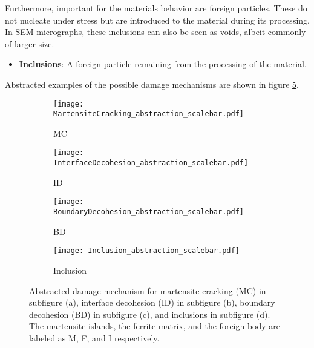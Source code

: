 Furthermore, important for the materials behavior are foreign particles. These do not nucleate under stress but are introduced to the material during its processing. In SEM micrographs, these inclusions can also be seen as voids, albeit commonly of larger size.
\begin{itemize}[label={}]
\item \textbf{Inclusions}: A foreign particle remaining from the processing of the material. 
\end{itemize}
Abstracted examples of the possible damage mechanisms are shown in figure \ref{fig:DamageCategories_abstraction}. \\



\begin{figure}[H]
\begin{subfigure}{.25\textwidth}
\centering
  \texttt{[image: MartensiteCracking\_abstraction\_scalebar.pdf]}
  \caption{MC}
  \label{sub:MC}
\end{subfigure}%
\begin{subfigure}{.25\textwidth}
\centering
  \texttt{[image: InterfaceDecohesion\_abstraction\_scalebar.pdf]}
  \caption{ID}
  \label{sub:ID}
\end{subfigure}%
\centering
\begin{subfigure}{.25\textwidth}
\centering
  \texttt{[image: BoundaryDecohesion\_abstraction\_scalebar.pdf]}
  \caption{BD}
  \label{sub:BD}
\end{subfigure}%
\centering
\begin{subfigure}{.25\textwidth}
\centering
  \texttt{[image: Inclusion\_abstraction\_scalebar.pdf]}
  \caption{Inclusion}
  \label{sub:Inc}
\end{subfigure}%
\caption{Abstracted damage mechanism for martensite cracking (MC) in subfigure (a), interface decohesion (ID) in subfigure (b), boundary decohesion (BD) in subfigure (c),  and inclusions in subfigure (d). The martensite islands, the ferrite matrix, and the foreign body are labeled as M, F, and I respectively.}
\label{fig:DamageCategories_abstraction}
\end{figure}


